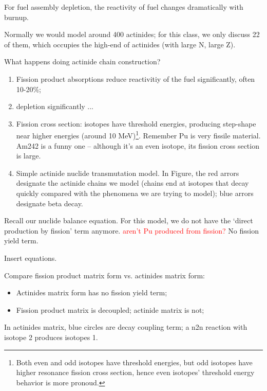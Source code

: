 \documentclass{school-22.211-notes}
\date{April 11, 2012}
\begin{document}
\maketitle

For fuel assembly depletion, the reactivity of fuel changes dramatically with burnup. 

Normally we would model around 400 actinides; for this class, we only discuss 22 of them, which occupies the high-end of actinides (with large N, large Z). 

What happens doing actinide chain construction? 
\begin{enumerate}
\item Fission product absorptions reduce reactivitiy of the fuel significantly, often 10-20\%;
\item {} depletion significantly ...

\item Fission cross section: isotopes have threshold energies, producing step-shape near higher energies (around 10 MeV)\footnote{Both even and odd isotopes have threshold energies, but odd isotopes have higher resonance fission cross section, hence even isotopes' threshold energy behavior is more pronoud.}. Remember Pu is very fissile material. Am242 is a funny one -- although it's an even isotope, its fission cross section is large. 

\item Simple actinide nuclide transmutation model. In Figure, the red arrors designate the actinide chains we model (chains end at isotopes that decay quickly compared with the phenomena we are trying to model); blue arrors designate beta decay. 
\end{enumerate}



\clearpage
{}
Recall our nuclide balance equation. For this model, we do not have the `direct production by fission' term anymore. \textcolor{red}{aren't Pu produced from fission?} No fission yield term. 

Insert equations. 


Compare fission product matrix form vs. actinides matrix form: 
\begin{itemize}
\item Actinides matrix form has no fission yield term;
\item Fission product matrix is decoupled; actinide matrix is not; 
\end{itemize}
In actinides matrix, blue circles are decay coupling term; a n2n reaction with isotope 2 produces isotopes 1. 
\end{document}

